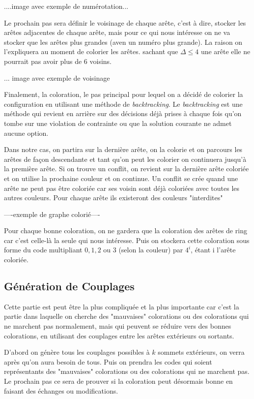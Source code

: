 \documentclass[10pt,a4paper]{article}
\begin{document}
....image avec exemple de numérotation...

Le prochain pas sera définir le voisinage de chaque arête, c'est à dire, stocker les arêtes adjacentes de chaque arête, mais pour ce qui nous intéresse on ne va stocker que les arêtes plus grandes (aven un numéro plus grande). La raison on l'expliquera au moment de colorier les arêtes. sachant que $\Delta \leq 4$ une arête elle ne pourrait pas avoir plus de 6 voisins.

... image avec exemple de voisinage

Finalement, la coloration, le pas principal pour lequel on a décidé de colorier la configuration en utilisant une méthode de \emph{backtracking}. Le \emph{backtracking} est une méthode qui revient en arrière sur des décisions déjà prises à chaque fois qu'on tombe sur une violation de contrainte ou que la solution courante ne admet aucune option. 

Dans notre cas, on partira sur la dernière arête, on la colorie et on parcours les arêtes de façon descendante et tant qu'on peut les colorier on continuera jusqu'à la première arête. Si on trouve un conflit, on revient sur la dernière arête coloriée et on utilise la prochaine couleur et on continue. Un conflit se crée quand une arête ne peut pas être coloriée car ses voisin sont déjà coloriées avec toutes les autres couleurs. Pour chaque arête ils existeront des couleurs "interdites" 

----exemple de graphe colorié----

Pour chaque bonne coloration, on ne gardera que la coloration des arêtes de ring car c'est celle-là la seule qui nous intéresse. Puis on stockera cette coloration sous forme du code multipliant $0,1,2$ ou $3$ (selon la couleur) par $4^{i}$, étant i l'arête coloriée.
\subsection{Génération de Couplages}

Cette partie est peut être la plus compliquée et la plus importante car c'est la partie dans laquelle on cherche des "mauvaises" colorations ou des colorations qui ne marchent pas normalement, mais qui peuvent se réduire vers des bonnes colorations, en utilisant des couplages entre les arêtes extérieurs ou sortants. 

D'abord on génère tous les couplages possibles à $k$ sommets extérieurs, on verra après qu'on aura besoin de tous. Puis on prendra les codes qui soient représentants des "mauvaises" colorations ou des colorations qui ne marchent pas. Le prochain pas ce sera de prouver si la coloration peut désormais bonne en faisant des échanges ou modifications. 
\end{document}
